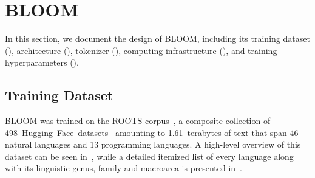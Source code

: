 \documentclass[twoside,11pt]{article}
\begin{document}
\section{BLOOM}

In this section, we document the design of BLOOM, including its training dataset (), architecture (), tokenizer (), computing infrastructure (), and training hyperparameters ().

\subsection{Training Dataset}
\label{sec:dataset}

BLOOM was trained on the ROOTS corpus~\citep{laurencon2022bigscience}, a composite collection of 498~Hugging~Face~datasets~\citep{lhoest-etal-2021-datasets} amounting to 1.61~terabytes of text that span 46 natural languages and 13 programming languages. A high-level overview of this dataset can be seen in~, while a detailed itemized list of every language along with its linguistic genus, family and macroarea is presented in~.
\end{document}
